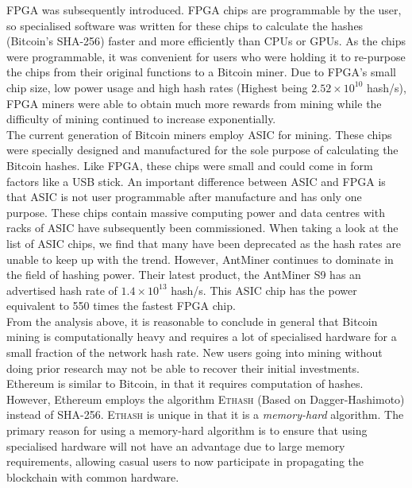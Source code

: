 \documentclass[a4paper,12pt]{article}
\newcounter{subsubsubsection}[subsubsection]
\begin{document}
{\ac{FPGA} was subsequently introduced. \ac{FPGA} chips are programmable by the user, so specialised software was written for these chips to calculate the hashes (Bitcoin's \textsc{SHA-256}) faster and more efficiently than \ac{CPU}s or \ac{GPU}s. As the chips were programmable, it was convenient for users who were holding it to re-purpose the chips from their original functions to a Bitcoin miner. Due to \ac{FPGA}'s small chip size, low power usage and high hash rates (Highest being $2.52\times10^{10}$ hash/s), \ac{FPGA} miners were able to obtain much more rewards from mining while the difficulty of mining continued to increase exponentially.\\\newline
The current generation of Bitcoin miners employ \ac{ASIC} for mining. These chips were specially designed and manufactured for the sole purpose of calculating the Bitcoin hashes. Like \ac{FPGA}, these chips were small and could come in form factors like a USB stick. An important difference between \ac{ASIC} and \ac{FPGA} is that \ac{ASIC} is not user programmable after manufacture and has only one purpose. These chips contain massive computing power and data centres with racks of \ac{ASIC} have subsequently been commissioned. When taking a look at the list of \ac{ASIC} chips, we find that many have been deprecated as the hash rates are unable to keep up with the trend. However, AntMiner continues to dominate in the field of hashing power. Their latest product, the AntMiner S9 has an advertised hash rate of $1.4\times10^{13}$ hash/s. This \ac{ASIC} chip has the power equivalent to 550 times the fastest \ac{FPGA} chip. \\\newline
From the analysis above, it is reasonable to conclude in general that Bitcoin mining is computationally heavy and requires a lot of specialised hardware for a small fraction of the network hash rate. New users going into mining without doing prior research may not be able to recover their initial investments. 
	Ethereum is similar to Bitcoin, in that it requires computation of hashes. However, Ethereum employs the algorithm \textsc{Ethash} (Based on Dagger-Hashimoto) instead of \textsc{SHA-256}. \textsc{Ethash} is unique in that it is a  \textit{memory-hard} algorithm. The primary reason for using a memory-hard algorithm is to ensure that using specialised hardware will not have an advantage due to large memory requirements, allowing casual users to now participate in propagating the blockchain with common hardware.\\\newline
}
\end{document}
